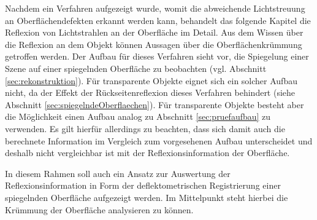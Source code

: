 Nachdem ein Verfahren aufgezeigt wurde, womit die abweichende Lichtstreuung an Oberflächendefekten erkannt werden kann, behandelt das folgende Kapitel die Reflexion von Lichtstrahlen an der Oberfläche im Detail.
Aus dem Wissen über die Reflexion an dem Objekt können Aussagen über die Oberflächenkrümmung getroffen werden.
Der Aufbau für dieses Verfahren sieht vor, die Spiegelung einer Szene auf einer spiegelnden Oberfläche zu beobachten (vgl. Abschnitt \ref{sec:rekonstruktion}).
Für transparente Objekte eignet sich ein solcher Aufbau nicht, da der Effekt der Rückseitenreflexion dieses Verfahren behindert (siehe Abschnitt \ref{sec:spiegelndeOberflaechen}).
Für transparente Objekte besteht aber die Möglichkeit einen Aufbau analog zu Abschnitt \ref{sec:pruefaufbau} zu verwenden.
Es gilt hierfür allerdings zu beachten, dass sich damit auch die berechnete Information im Vergleich zum vorgesehenen Aufbau unterscheidet und deshalb nicht vergleichbar ist mit der Reflexionsinformation der Oberfläche.

\p
In diesem Rahmen soll auch ein Ansatz zur Auswertung der Reflexionsinformation in Form der deflektometrischen Registrierung einer spiegelnden Oberfläche aufgezeigt werden.
Im Mittelpunkt steht hierbei die Krümmung der Oberfläche analysieren zu können.

